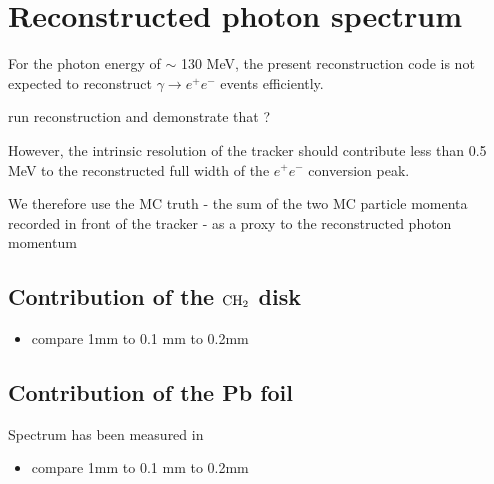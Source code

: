 \section{Reconstructed photon spectrum}

For the photon energy of $\sim$ 130 MeV, the present reconstruction code is not expected
to reconstruct $\gamma \to e^+e^-$ events efficiently.

{\red run reconstruction and demonstrate that ? }

However, the intrinsic resolution of the tracker should contribute less than 0.5 MeV to the
reconstructed full width of the $e^+e^-$ conversion peak.

We therefore use the MC truth - the sum of the two MC particle momenta recorded in front
of the tracker - as a proxy to the reconstructed photon momentum
\subsection{Contribution of the $\rm CH_2$ disk }
\begin{itemize}
\item
  compare 1mm to 0.1 mm to 0.2mm
\end{itemize}

\subsection{Contribution of the Pb foil}

Spectrum has been measured in \cite{RPC_1977_Baer}
\begin{itemize}
\item
  compare 1mm to 0.1 mm to 0.2mm
\end{itemize}


